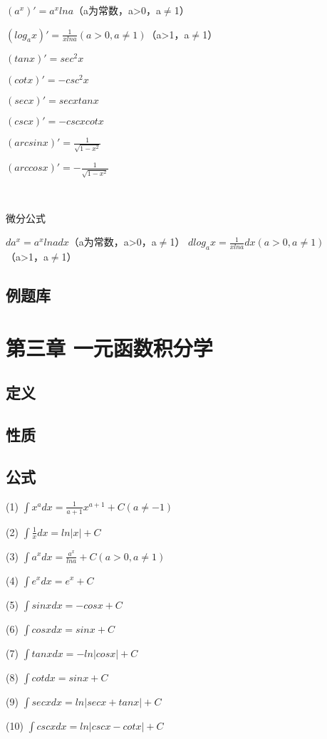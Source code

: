 \documentclass{ctexart}
\begin{document}
$(a^x)'=a^xlna$（a为常数，a>0，a$\neq$1） 

$(log_ax)'=\frac{1}{xlna}(a>0,a\neq 1)$（a>1，a$\neq$1） 

$(tanx)'={sec}^2x$

$(cotx)'=-{csc^2}x$

$(secx)'=secxtanx$

$(cscx)'=-cscxcotx$

$(arcsinx)'=\frac{1}{\sqrt{1-x^2}}$

$(arccosx)'=-\frac{1}{\sqrt{1-x^2}}$

$ $

$ $
\\\\
微分公式

$da^x=a^xlnadx$（a为常数，a>0，a$\neq$1）
$dlog_ax=\frac{1}{xlna}dx(a>0,a\neq 1)$ （a>1，a$\neq$1）




\subsection{例题库}


\section{第三章 一元函数积分学}
\subsection{定义}
\subsection{性质}
\subsection{公式}
(1) $\int x^adx=\frac{1}{a+1}x^{a+1}+C(a\neq-1)$

(2) $\int \frac{1}{x}dx=ln|x|+C$

(3) $\int a^xdx=\frac{a^x}{lna}+C(a>0,a\neq1)$

(4) $\int e^xdx=e^x+C$

(5) $\int sinxdx=-cosx+C$

(6) $\int cosxdx=sinx+C$

(7) $\int tanxdx=-ln|cosx|+C$

(8) $\int cotdx=sinx+C$

(9) $\int secxdx=ln|secx+tanx|+C$

(10)  $\int cscxdx=ln|cscx-cotx|+C$
\end{document}
